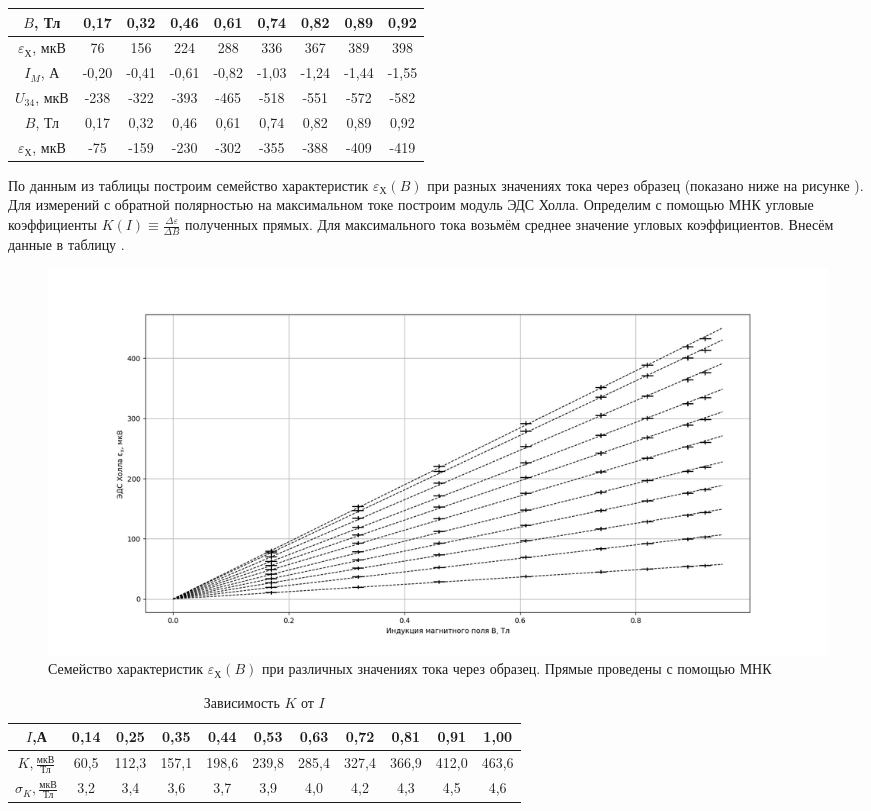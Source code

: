 \documentclass[a4paper,10pt]{article}
\begin{document}
\begin{table}
\begin{tabular}{|c|c|c|c|c|c|c|c|c|}
		$B$, Тл & 0,17 & 0,32 & 0,46 & 0,61 & 0,74 & 0,82 & 0,89 & 0,92 \\ \hline
		$\varepsilon_{\text{Х}}$, мкВ & 76 & 156 & 224 & 288 & 336 & 367 & 389 & 398 \\ \hline
		\hline
		$I_M$, А & -0,20 & -0,41 & -0,61 & -0,82 & -1,03 & -1,24 & -1,44 & -1,55 \\ \hline
		$U_{34}$, мкВ & -238 & -322 & -393 & -465 & -518 & -551 & -572 & -582 \\ \hline
		$B$, Тл & 0,17 & 0,32 & 0,46 & 0,61 & 0,74 & 0,82 & 0,89 & 0,92 \\ \hline
		$\varepsilon_{\text{Х}}$, мкВ & -75 & -159 & -230 & -302 & -355 & -388 & -409 & -419 \\ \hline
	\end{tabular}
\end{table}

По данным из таблицы  построим семейство характеристик $\varepsilon_{\text{Х}}(B)$ при разных значениях тока через образец (показано ниже на рисунке ). Для измерений с обратной полярностью на максимальном токе построим модуль ЭДС Холла. Определим с помощью МНК угловые коэффициенты $K(I)\equiv\frac{\Delta\varepsilon}{\Delta B}$ полученных прямых. Для максимального тока возьмём среднее значение угловых коэффициентов. Внесём данные в таблицу .

\begin{figure}[h]
	\centering
	\includegraphics[scale = 0.33]{hui}
	\caption{Семейство характеристик $\varepsilon_{\text{Х}}(B)$ при различных значениях тока через образец. Прямые проведены с помощью МНК} \label{hui}
\end{figure} 

\begin{table}[h]
	\centering
	\caption{Зависимость $K$ от $I$} \label{hhui}
	\begin{tabular}{|c|c|c|c|c|c|c|c|c|c|c|}
		\hline
		$I$,А&0,14&0,25&0,35&0,44&0,53&0,63&0,72&0,81&0,91&1,00\\ \hline
		$K,\frac{\text{мкВ}}{\text{Тл}}$&60,5&112,3&157,1&198,6&239,8&285,4&327,4&366,9&412,0&463,6\\ \hline
		$\sigma_K,\frac{\text{мкВ}}{\text{Тл}}$&3,2&3,4&3,6&3,7&3,9&4,0&4,2&4,3&4,5&4,6\\ \hline
	\end{tabular}
\end{table}
\end{document}
